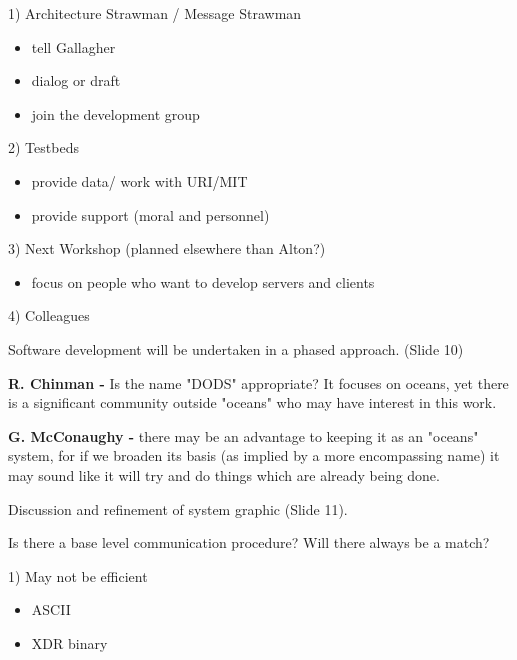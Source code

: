 \begin{description}
\begin{description}
	\item{1)} Architecture Strawman / Message Strawman
	   \begin{itemize}
		\item tell Gallagher
		\item dialog or draft
		\item join the development  group
	   \end{itemize}
	\item{2)} Testbeds
	   \begin{itemize}
		\item provide data/ work with URI/MIT
		\item provide support (moral and personnel)
	   \end{itemize}
	\item{3)} Next Workshop (planned elsewhere than Alton?)
	   \begin{itemize}
		\item focus on people who want to develop servers and clients
	   \end{itemize}
	\item{4)} Colleagues
\end{description}
\medskip

Software development will be undertaken in a phased approach. (Slide 10)
\smallskip
\begin{figure}[h]
\centerline{}

\end{figure}
\clearpage
{\bf R. Chinman -} Is the name "DODS" appropriate? It focuses on oceans, yet 
there is a significant community outside "oceans" who may have interest 
in this work.

\smallskip
{\bf G. McConaughy -} there may be an advantage to keeping it as an "oceans" 
system, for if we broaden its basis (as implied by a more encompassing 
name) it may sound like it will try and do things which are already being 
done.

\smallskip
Discussion and refinement of system graphic (Slide 11).
\smallskip

\begin{figure}[h]
\centerline{}
\end{figure}
\clearpage

Is there a base level communication procedure?  Will there always be a 
match?
\begin{description}
	\item{1)} May not be efficient
	   \begin{itemize}
		\item ASCII
		\item XDR binary
	   \end{itemize}


\end{description}
\end{description}
